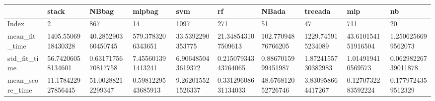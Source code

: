 \begin{tabular}{llllllllll}
\toprule
{} &                                              stack &                                              NBbag &                                             mlpbag &                                                svm &                                                 rf &                                              NBada &                                            treeada &                                                mlp &                                                 nb \\
\midrule
Index                       &                                                  2 &                                                867 &                                                 14 &                                               1097 &                                                271 &                                                 51 &                                                 47 &                                                711 &                                                 20 \\
mean\_fit\_time               &                                 1405.5506918430328 &                                 40.285290360450745 &                                  579.3783206343651 &                                   33.5392290353775 &                                 21.348543107509613 &                                 102.77094876766205 &                                  1229.745915234089 &                                 43.610154151916504 &                                 1.2506256699562073 \\
std\_fit\_time                &                                  56.74206058134601 &                                 0.6317175670817758 &                                  7.455601391413241 &                                  6.906485043619372 &                                0.21507934343764065 &                                 0.8867015999451987 &                                 1.8724155730382983 &                                  1.014919410569573 &                                0.06298226739011878 \\
mean\_score\_time             &                                 11.178422927856445 &                                  51.00288212299347 &                                 0.5981229543685913 &                                  9.262015521526337 &                                0.33129608631134033 &                                 48.676812052726746 &                                  3.830958664417267 &                                 0.1270732283592224 &                                 0.1779724359512329 \\

\end{tabular}
